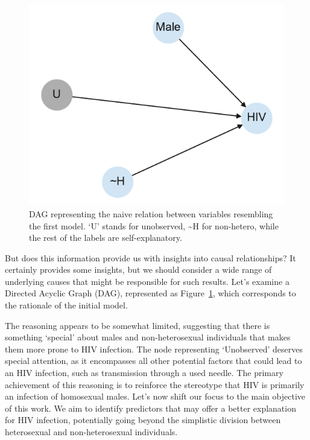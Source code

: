 \documentclass[
  12pt,
  letterpaper,
  DIV=11,
  numbers=noendperiod]{scrartcl}
\begin{document}
\begin{figure}

{\centering \includegraphics{HIVPaper_files/figure-latex/fig-dagwrong-output-1.pdf}

}

\caption{\label{fig-dagwrong}DAG representing the naive relation between
variables resembling the first model. `U' stands for unobserved,
\textasciitilde H for non-hetero, while the rest of the labels are
self-explanatory.}

\end{figure}

But does this information provide us with insights into causal
relationships? It certainly provides some insights, but we should
consider a wide range of underlying causes that might be responsible for
such results. Let's examine a Directed Acyclic Graph (DAG), represented
as Figure~\ref{fig-dagwrong}, which corresponds to the rationale of the
initial model.

The reasoning appears to be somewhat limited, suggesting that there is
something `special' about males and non-heterosexual individuals that
makes them more prone to HIV infection. The node representing
`Unobserved' deserves special attention, as it encompasses all other
potential factors that could lead to an HIV infection, such as
transmission through a used needle. The primary achievement of this
reasoning is to reinforce the stereotype that HIV is primarily an
infection of homosexual males. Let's now shift our focus to the main
objective of this work. We aim to identify predictors that may offer a
better explanation for HIV infection, potentially going beyond the
simplistic division between heterosexual and non-heterosexual
individuals.
\end{document}
